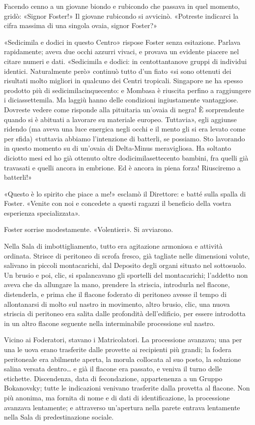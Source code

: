 \documentclass[
a5paper, %
10pt, %
twoside, 
onecolumn, %
openany, %
]{memoir}
\begin{document}
Facendo cenno a un giovane biondo e rubicondo che passava in quel momento, gridò: «Signor Foster!» Il giovane rubicondo si avvicinò. «Potreste indicarci la cifra massima di una singola ovaia, signor Foster?»

«Sedicimila e dodici in questo Centro» rispose Foster senza esitazione. Parlava rapidamente; aveva due occhi azzurri vivaci, e provava un evidente piacere nel citare numeri e dati. «Sedicimila e dodici: in centottantanove gruppi di individui identici. Naturalmente però» continuò tutto d’un fiato «si sono ottenuti dei risultati molto migliori in qualcuno dei Centri tropicali. Singapore ne ha spesso prodotto più di sedicimilacinquecento: e Mombasa è riuscita perfino a raggiungere i diciassettemila. Ma laggiù hanno delle condizioni ingiustamente vantaggiose. Dovreste vedere come risponde alla pituitaria un’ovaia di negra! È sorprendente quando si è abituati a lavorare su materiale europeo. Tuttavia», egli aggiunse ridendo (ma aveva una luce energica negli occhi e il mento gli si era levato come per sfida) «tuttavia abbiamo l’intenzione di batterli, se possiamo. Sto lavorando in questo momento su di un’ovaia di Delta-Minus meravigliosa. Ha soltanto diciotto mesi ed ho già ottenuto oltre dodicimilasettecento bambini, fra quelli già travasati e quelli ancora in embrione. Ed è ancora in piena forza! Riusciremo a batterli!»

«Questo è lo spirito che piace a me!» esclamò il Direttore: e batté sulla spalla di Foster. «Venite con noi e concedete a questi ragazzi il beneficio della vostra esperienza specializzata».

Foster sorrise modestamente. «Volentieri». Si avviarono.

Nella Sala di imbottigliamento, tutto era agitazione armoniosa e attività ordinata. Strisce di peritoneo di scrofa fresco, già tagliate nelle dimensioni volute, salivano in piccoli montacarichi, dal Deposito degli organi situato nel sottosuolo. Un brusio e poi, clic, si spalancavano gli sportelli del montacarichi; l’addetto non aveva che da allungare la mano, prendere la striscia, introdurla nel flacone, distenderla, e prima che il flacone foderato di peritoneo avesse il tempo di allontanarsi di molto sul nastro in movimento, altro brusio, clic, una nuova striscia di peritoneo era salita dalle profondità dell’edificio, per essere introdotta in un altro flacone seguente nella interminabile processione sul nastro.

Vicino ai Foderatori, stavano i Matricolatori. La processione avanzava; una per una le uova erano trasferite dalle provette ai recipienti più grandi; la fodera peritoneale era abilmente aperta, la morula collocata al suo posto, la soluzione salina versata dentro… e già il flacone era passato, e veniva il turno delle etichette. Discendenza, data di fecondazione, appartenenza a un Gruppo Bokanovsky; tutte le indicazioni venivano trasferite dalla provetta al flacone. Non più anonima, ma fornita di nome e di dati di identificazione, la processione avanzava lentamente; e attraverso un’apertura nella parete entrava lentamente nella Sala di predestinazione sociale.
\end{document}
